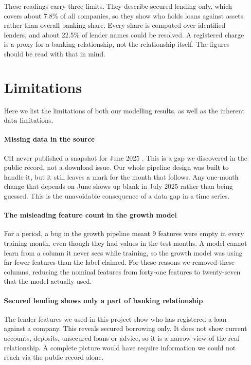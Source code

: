 \documentclass[    author={Samuel Menon Demelo; Sneha Saphala Ram Prasad; 
Viktor Ander Lindholm; Vishal Khatri},
               supervisor={Prof. Fernando Moreno-Pino},
                   degree={MSc},
                    title={Lloyds Commercial Banking Intelligence},
                 subtitle={Ranking SME Lending, Risk and Growth Prospects for Lloyds Banking Group},
                     type={},
                     year={2026}]{dissertation}
\begin{document}
These readings carry three limits. They describe secured lending only, which covers about 7.8\% of all companies, so they show who holds loans against assets rather than overall banking share. Every share is computed over identified lenders, and about 22.5\% of lender names could be resolved. A registered charge is a proxy for a banking relationship, not the relationship itself. The figures should be read with that in mind.


\section{Limitations}
\label{sec:limits}
Here we list the limitations of both our modelling results, as well as the inherent data limitations.

\paragraph{Missing data in the source}
CH never published a snapshot for June 2025 \cite{companieshouse_api}. This is a gap we discovered in the public record, not a download issue. Our whole pipeline design was built to handle it, but it still leaves a mark for the month that follows. Any one-month change that depends on June shows up blank in July 2025 rather than being guessed. This is the unavoidable consequence of a data gap in a time series.

\paragraph{The misleading feature count in the growth model}
For a period, a bug in the growth pipeline meant 9 features were empty in every training month, even though they had values in the test months. A model cannot learn from a column it never sees while training, so the growth model was using far fewer features than the label claimed. For these reasons we removed these columns, reducing the nominal features from forty-one features to twenty-seven that the model actually used.

\paragraph{Secured lending shows only a part of banking relationship}
The lender features we used in this project show who has registered a loan against a company. This reveals secured borrowing only. It does not show current accounts, deposits, unsecured loans or advice, so it is a narrow view of the real relationship. A complete picture would have require information we could not reach via the public record alone.
\end{document}
